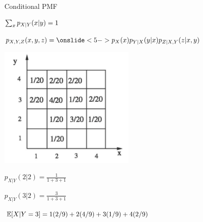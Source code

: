 \documentclass[fleqn,aspectratio=169]{beamer}
\begin{document}
\begin{frame}{Conditional PMF}


{
\plitemsep 0.1in
\small

\bci 
\item {} 

\item<3-> $\sum_{x} p_{X|Y}(x|y) = 1$

\item {}


\item $p_{X,Y,Z}(x,y,z) = \onslide<5->{\px \pycx p_{Z|X,Y}(z | x,y)}$
\eci 
}
{
\includegraphics[width=0.5\textwidth]{L3_joint_ex.png}

\medskip
\small

$p_{X|Y}(2|2) = \frac{1}{1+3+1}$

\bigskip
$p_{X|Y}(3|2)= \frac{3}{1+3+1}$

\bigskip

$\mathbb{E}[ X | Y = 3 ] = 1(2/9)+ 2(4/9)+3(1/9)+4(2/9) $

}
\end{frame}
\end{document}

